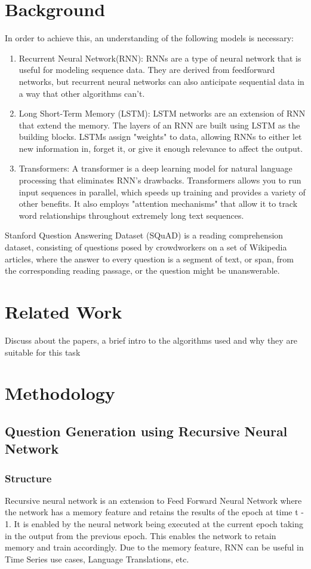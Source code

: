 \documentclass[oneside,a4paper]{article}
\begin{document}
\section{Background}
In order to achieve this, an understanding of the following models is necessary:
     \begin{enumerate}
         \item Recurrent Neural Network(RNN): RNNs are a type of neural network that is useful for modeling sequence data. They are derived from feedforward networks, but recurrent neural networks can also anticipate sequential data in a way that other algorithms can't.
         \item Long Short-Term Memory (LSTM): LSTM networks are an extension of RNN that extend the memory. The layers of an RNN are built using LSTM as the building blocks. LSTMs assign "weights" to data, allowing RNNs to either let new information in, forget it, or give it enough relevance to affect the output.
         \item Transformers: A transformer is a deep learning model for natural language processing that eliminates RNN's drawbacks. Transformers allows you to run input sequences in parallel, which speeds up training and provides a variety of other benefits. It also employs "attention mechanisms" that allow it to track word relationships throughout extremely long text sequences.  
     \end{enumerate}
     Stanford Question Answering Dataset (SQuAD) is a reading comprehension dataset, consisting of questions posed by crowdworkers on a set of Wikipedia articles, where the answer to every question is a segment of text, or span, from the corresponding reading passage, or the question might be unanswerable.

\section{Related Work}
Discuss about the papers, a brief intro to the algorithms used and why they are suitable for this task

\section{Methodology}
\subsection{Question Generation using Recursive Neural Network}
\subsubsection{Structure}
Recursive neural network is an extension to Feed Forward Neural Network where the network has a memory feature and retains the results of the epoch at time t - 1. It is enabled by the neural network being executed at the current epoch taking in the output from the previous epoch. This enables the network to retain memory and train accordingly. Due to the memory feature, RNN can be useful in Time Series use cases, Language Translations, etc.
\end{document}
